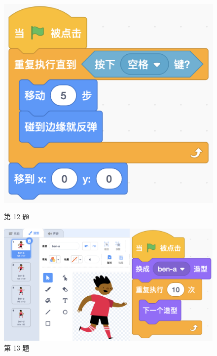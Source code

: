 \documentclass[10pt, a4paper]{article}
\begin{document}
\begin{enumerate}
        \begin{figure}[htbp]
            \centering
            \begin{minipage}[t]{.19\textwidth}
                \centering
                \includegraphics[width=\textwidth]{12.png}
                \caption*{第 12 题}
            \end{minipage}
            \begin{minipage}[t]{.33\textwidth}
                \centering
                \includegraphics[width=\textwidth]{13.png}
                \caption*{第 13 题}
            \end{minipage}
            \begin{minipage}[t]{.33\textwidth}
                \begin{minipage}[t]{.33\textwidth}

\end{minipage}
\end{minipage}
\end{figure}
\end{enumerate}
\end{document}
